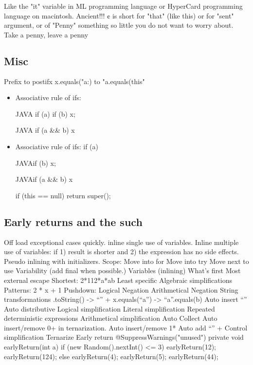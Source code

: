 Like the "it" variable in ML programming language or HyperCard programming language on macintosh. Ancient!!!
¢ is short for "that" (like this) or for "sent" argument, or of "Penny" something so little you do not want to worry about.
Take a penny, leave a penny

\subsection{Misc}
Prefix to postifx
x.equals("a:) to "a.equals(this"

\begin{itemize}
\item Associative rule of ifs: 
  \begin{code}{JAVA}
  if (a) if (b) x;
\end{code}
  \begin{code}{JAVA}
  if (a && b) x
  \end{code}
\item Associative rule of ifs: if (a) 
\begin{code}{JAVA}if (b) x;\end{code}
\begin{code}{JAVA}if (a && b) x\end{code}
\begin{java}if (this == null) return super();\end{java}
  
  \end{itemize}

\subsection{Early returns and the such}
Off load exceptional cases quickly.
inline single use of variables.
Inline multiple use of variables: if 1) result is shorter and 2) the expression has no side effects.
Pseudo inlining with initializers.
Scope:
Move into for
Move into try
Move next to use
Variability (add final when possible.)
Variables (inlining)
What’s first
Most external escape
Shortest: 2*112*a*ab
Least specific
Algebraic simplifications
Patterns: 2 * x + 1
Pushdown:
Logical Negation
Arithmetical Negation
String transformations
.toString() -> “” +
x.equals(“a”) -> “a”.equals(b)
Auto insert “”
Auto distributive
Logical simplification
Literal simplification
Repeated deterministic expressions
Arithmetical simplification
Auto Collect
Auto insert/remove 0+ in ternarization.
Auto insert/remove 1*
Auto add “” +
Control simplification
Ternarize
Early return
@SuppressWarnings("unused") private
void earlyReturn(int a) {
  if (new Random().nextInt() <= 3) {
    earlyReturn(12);
    earlyReturn(124);
    } else {
    earlyReturn(4);
    earlyReturn(5);
    earlyReturn(44);
  }
}

